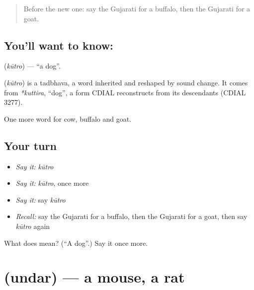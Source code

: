 \label{lesson:GU-C67-dog}



\begin{quote}
Before the new one: say the Gujarati for a buffalo, then the Gujarati for a goat.
\end{quote}

\subsection*{You'll want to know: }
\textbf{} (\emph{kūtro}) — \textquotedblleft{}a dog\textquotedblright{}.

\begin{cousinweb}
\textbf{} (\emph{kūtro}) is a tadbhava, a word inherited and reshaped by sound change. It comes from \emph{*kuttira}, \textquotedblleft{}dog\textquotedblright{}, a form CDIAL reconstructs from its descendants (CDIAL 3277).
\end{cousinweb}

\begin{grammarlens}[title={What you've built}]
One more word for cow, buffalo and goat.
\end{grammarlens}

\subsection*{Your turn}
\begin{itemize}
\raggedright
  \item \emph{Say it:} \emph{kūtro}
  \item \emph{Say it:} \emph{kūtro}, once more
  \item \emph{Say it:} say \emph{kūtro}
  \item \emph{Recall:} say the Gujarati for a buffalo, then the Gujarati for a goat, then say \emph{kūtro} again
\end{itemize}

\begin{tcolorbox}[breakable,colback=teal!4,colframe=teal!35!black,title={Before you move on}]
What does  mean? (\textquotedblleft{}A dog\textquotedblright{}.) Say it once more.
\end{tcolorbox}
\section[\texorpdfstring{\gu{ઉંદર} (undar)}{ઉંદર (undar)}]{ (undar) — a mouse, a rat}

